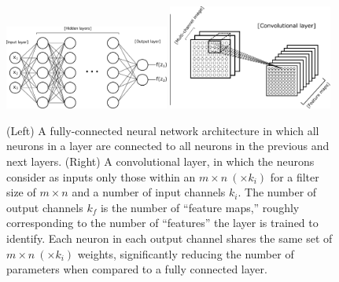 \documentclass[11pt,a4paper]{article}
\begin{document}
\begin{figure}[!htb]
	\centering
	\includegraphics[width= 0.48\textwidth]{fig/general_nn_fc.pdf}
	\includegraphics[width= 0.48\textwidth]{fig/cnn_example.pdf}
	\caption{(Left) A fully-connected neural network architecture in which all neurons in a layer are connected to all neurons in the previous and next layers. (Right) A convolutional layer, in which the neurons consider as inputs only those within an $m \times n ~(\times k_i)$ for a filter size of $m \times n$ and a number of input channels $k_i$. The number of output channels $k_f$ is the number of ``feature maps,'' roughly corresponding to the number of ``features'' the layer is trained to identify. Each neuron in each output channel shares the same set of $m \times n ~(\times k_i)$ weights, significantly reducing the number of parameters when compared to a fully connected layer.} \label{fig.nets}
\end{figure}
\end{document}
